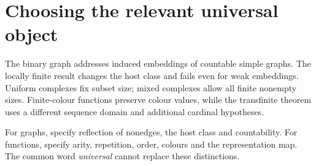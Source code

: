 \section{Choosing the relevant universal object}
\label{sec:p03-rado64-reference}

The binary graph addresses induced embeddings of countable simple graphs.
The locally finite result changes the host class and fails even for weak
embeddings. Uniform complexes fix subset size; mixed complexes allow all
finite nonempty sizes. Finite-colour functions preserve colour values, while
the transfinite theorem uses a different sequence domain and additional
cardinal hypotheses.

For graphs, specify reflection of nonedges, the host class and countability.
For functions, specify arity, repetition, order, colours and the representation
map. The common word \emph{universal} cannot replace these distinctions.
